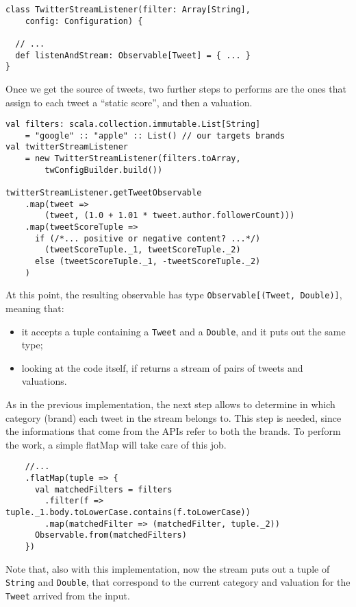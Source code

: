 \begin{verbatim}
class TwitterStreamListener(filter: Array[String],
    config: Configuration) {

  // ...
  def listenAndStream: Observable[Tweet] = { ... }
}
\end{verbatim}

Once we get the source of tweets, two further steps to performs are the
ones that assign to each tweet a ``static score'', and then a
valuation.

\begin{verbatim}
val filters: scala.collection.immutable.List[String]
    = "google" :: "apple" :: List() // our targets brands
val twitterStreamListener
    = new TwitterStreamListener(filters.toArray,
        twConfigBuilder.build())

twitterStreamListener.getTweetObservable
    .map(tweet =>
        (tweet, (1.0 + 1.01 * tweet.author.followerCount)))
    .map(tweetScoreTuple =>
      if (/*... positive or negative content? ...*/)
        (tweetScoreTuple._1, tweetScoreTuple._2)
      else (tweetScoreTuple._1, -tweetScoreTuple._2)
    )
\end{verbatim}

At this point, the resulting observable has type
\texttt{Observable{[}(Tweet,\ Double){]}}, meaning that:

\begin{itemize}
\itemsep1pt\parskip0pt
\item
  it accepts a tuple containing a \texttt{Tweet} and a \texttt{Double},
  and it puts out the same type;
\item
  looking at the code itself, if returns a stream of pairs of tweets and
  valuations.
\end{itemize}

As in the previous implementation, the next step allows to determine in
which category (brand) each tweet in the stream belongs to. This step is
needed, since the informations that come from the APIs refer to both the
brands. To perform the work, a simple flatMap will take care of this
job.

\begin{verbatim}
    //...
    .flatMap(tuple => {
      val matchedFilters = filters
        .filter(f => tuple._1.body.toLowerCase.contains(f.toLowerCase))
        .map(matchedFilter => (matchedFilter, tuple._2))
      Observable.from(matchedFilters)
    })
\end{verbatim}

Note that, also with this implementation, now the stream puts out a
tuple of \texttt{String} and \texttt{Double}, that correspond to the
current category and valuation for the \texttt{Tweet} arrived from the
input.

